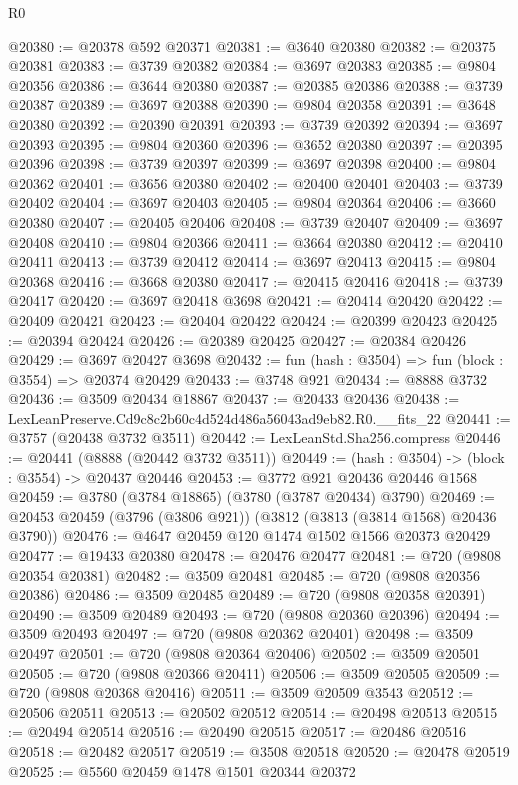 \begin{lexlean}{R0}
\begin{coremodule}
@20380 := @20378 @592 @20371
@20381 := @3640 @20380
@20382 := @20375 @20381
@20383 := @3739 @20382
@20384 := @3697 @20383
@20385 := @9804 @20356
@20386 := @3644 @20380
@20387 := @20385 @20386
@20388 := @3739 @20387
@20389 := @3697 @20388
@20390 := @9804 @20358
@20391 := @3648 @20380
@20392 := @20390 @20391
@20393 := @3739 @20392
@20394 := @3697 @20393
@20395 := @9804 @20360
@20396 := @3652 @20380
@20397 := @20395 @20396
@20398 := @3739 @20397
@20399 := @3697 @20398
@20400 := @9804 @20362
@20401 := @3656 @20380
@20402 := @20400 @20401
@20403 := @3739 @20402
@20404 := @3697 @20403
@20405 := @9804 @20364
@20406 := @3660 @20380
@20407 := @20405 @20406
@20408 := @3739 @20407
@20409 := @3697 @20408
@20410 := @9804 @20366
@20411 := @3664 @20380
@20412 := @20410 @20411
@20413 := @3739 @20412
@20414 := @3697 @20413
@20415 := @9804 @20368
@20416 := @3668 @20380
@20417 := @20415 @20416
@20418 := @3739 @20417
@20420 := @3697 @20418 @3698
@20421 := @20414 @20420
@20422 := @20409 @20421
@20423 := @20404 @20422
@20424 := @20399 @20423
@20425 := @20394 @20424
@20426 := @20389 @20425
@20427 := @20384 @20426
@20429 := @3697 @20427 @3698
@20432 := fun (hash : @3504) => fun (block : @3554) => @20374 @20429
@20433 := @3748 @921
@20434 := @8888 @3732
@20436 := @3509 @20434 @18867
@20437 := @20433 @20436
@20438 := LexLeanPreserve.Cd9c8c2b60c4d524d486a56043ad9eb82.R0.__fits_22
@20441 := @3757 (@20438 @3732 @3511)
@20442 := LexLeanStd.Sha256.compress
@20446 := @20441 (@8888 (@20442 @3732 @3511))
@20449 := (hash : @3504) -> (block : @3554) -> @20437 @20446
@20453 := @3772 @921 @20436 @20446 @1568
@20459 := @3780 (@3784 @18865) (@3780 (@3787 @20434) @3790)
@20469 := @20453 @20459 (@3796 (@3806 @921)) (@3812 (@3813 (@3814 @1568) @20436 @3790))
@20476 := @4647 @20459 @120 @1474 @1502 @1566 @20373 @20429
@20477 := @19433 @20380
@20478 := @20476 @20477
@20481 := @720 (@9808 @20354 @20381)
@20482 := @3509 @20481
@20485 := @720 (@9808 @20356 @20386)
@20486 := @3509 @20485
@20489 := @720 (@9808 @20358 @20391)
@20490 := @3509 @20489
@20493 := @720 (@9808 @20360 @20396)
@20494 := @3509 @20493
@20497 := @720 (@9808 @20362 @20401)
@20498 := @3509 @20497
@20501 := @720 (@9808 @20364 @20406)
@20502 := @3509 @20501
@20505 := @720 (@9808 @20366 @20411)
@20506 := @3509 @20505
@20509 := @720 (@9808 @20368 @20416)
@20511 := @3509 @20509 @3543
@20512 := @20506 @20511
@20513 := @20502 @20512
@20514 := @20498 @20513
@20515 := @20494 @20514
@20516 := @20490 @20515
@20517 := @20486 @20516
@20518 := @20482 @20517
@20519 := @3508 @20518
@20520 := @20478 @20519
@20525 := @5560 @20459 @1478 @1501 @20344 @20372

\end{coremodule}
\end{lexlean}
